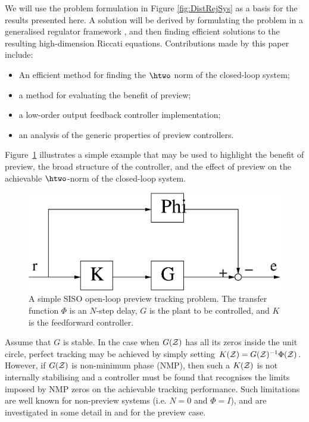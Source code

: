 We will use the problem formulation in Figure \ref{fig:DistRejSys} as a basis for the results presented here. A solution will be derived
by formulating the problem in a generalised regulator framework \cite{LimebeerGreen,ZDG}, and then finding efficient solutions to the resulting high-dimension Riccati equations. Contributions made by this paper include:
\begin{itemize}
\item An efficient method for finding the $\htwo$ norm of the closed-loop system;
\item a method for evaluating the benefit of preview;
\item a low-order output feedback controller implementation;
\item an analysis of the  generic properties of preview controllers.
\end{itemize}

Figure~\ref{fig:SimpleSISOPrev} illustrates a simple example that may be used to highlight the benefit of preview, the broad structure of the controller, and the effect of preview on the achievable $\htwo$-norm of the closed-loop system. 
\begin{figure}
\stdcontrolfrags
\begin{center}
\includegraphics[width=0.4\hsize]{./diags/SimpleExampleNominalNoK2.eps}
\end{center}
\caption{A simple SISO open-loop preview tracking problem. The transfer function $\Phi$ is an $N$-step delay, $G$ is the plant to be controlled, and $K$ is the feedforward controller.}
\label{fig:SimpleSISOPrev}
\end{figure}

Assume that $G$ is stable. In the case when $G(\mathcal{Z})$ has all its zeros inside the unit circle, perfect tracking may be achieved by simply setting $K(\mathcal{Z})=G(\mathcal{Z})^{-1}\Phi(\mathcal{Z})$. 
However, if $G(\mathcal{Z})$ is non-minimum phase (NMP), then such a $K(\mathcal{Z})$ is not internally stabilising and a controller must be found that recognises the limits imposed by NMP zeros on the achievable tracking performance. Such limitations are well known for non-preview systems (i.e. $N=0$ and $\Phi=I$), and are investigated in some detail in \cite{Middleteon_2004_PrevPerf} and \cite{Mirkin_2004_FixedLagPerfSaturation} for the preview case.

